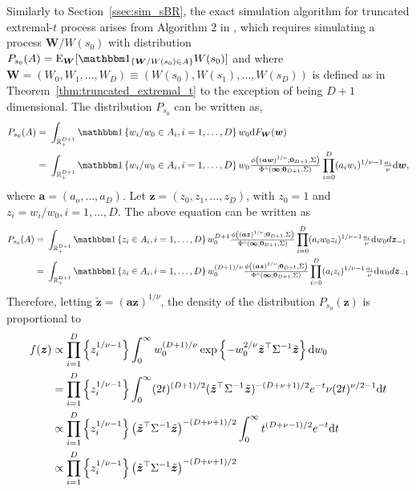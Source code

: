 \documentclass[12pt]{article}
\begin{document}
Similarly to Section~\ref{ssec:sim_sBR}, the exact simulation algorithm for truncated extremal-$t$ process arises from Algorithm 2 in \cite{Dombry.Engelke.Oesting:2016}, which requires simulating a process $\bm W/W(s_0)$ with distribution $P_{s_0}(A) = \E_{\bm W}[\mathbbm 1_{\{\bm W/W(s_0)\in A\}}W(s_0)]$ and where $\bm W = (W_0, W_1, \ldots, W_D) \equiv \left( W(s_0), W(s_1), \ldots, W(s_D)\right)$ is defined as in Theorem~\ref{thm:truncated_extremal_t} to the exception of being $D+1$ dimensional. The distribution $P_{s_0}$ can be written as,
\begin{align*}
	P_{s_0}(A) =&\ \int_{\mathbb{R}_+^{D+1}} \mathbbm 1 \left\{w_i/w_0 \in A_i, i=1,\dots,D  \right\} w_0 \text dF_{\bm W}(\bm w)  \\
	=&\ \int_{\mathbb{R}_+^{D+1}} \mathbbm 1 \left\{ w_i/w_0 \in A_i, i=1,\dots,D \right\} w_0 \frac{\phi\left(\left( \bm a \bm w\right)^{1/\nu};\bm 0_{D+1},\Sigma\right)}{\Phi^\circ(\bm \infty; \bm 0_{D+1}, \Sigma)} \prod_{i=0}^D(a_i w_i)^{1/\nu-1} \frac{a_i}{\nu} \text d \bm w,
\end{align*}  	
where $\bm a = (a_o, \ldots, a_D)$.
Let $\bm z = (z_0, z_1, \ldots, z_D)$, with $z_0 = 1$ and $z_i = w_i/w_0, i=1, \ldots, D$. The above equation can be written as
%
\begin{align*}
P_{s_0}(A) =&\ \int_{\mathbb{R}_+^{D+1}} \mathbbm 1 \left\{z_i \in A_i, i=1,\dots,D\right\} w_0^{D+1} 
\frac{\phi\left(\left( \bm a \bm z\right)^{1/\nu};\bm 0_{D+1},\Sigma\right)}{\Phi^\circ(\bm \infty; \bm 0_{D+1}, \Sigma)} \prod_{i=0}^D(a_i w_0 z_i)^{1/\nu-1} \frac{a_i}{\nu} \text dw_0 d \bm z_{-1}\\
=&\ \int_{\mathbb{R}_+^{D+1}} \mathbbm 1 \left\{ z_i \in A_i, i=1,\dots,D\right\} w_0^{(D+1)/\nu} \frac{\phi\left(\left( \bm a \bm z\right)^{1/\nu};\bm 0_{D+1},\Sigma\right)}{\Phi^\circ(\bm \infty; \bm 0_{D+1}, \Sigma)} \prod_{i=0}^D(a_i z_i)^{1/\nu-1} \frac{a_i}{\nu} \text dw_0 d \bm z_{-1}\\
\end{align*}
%
Therefore, letting $\tilde{\bm z} = ( \bm a \bm z)^{1/\nu}$, the density of the distribution $P_{s_0}(\bm z)$ is proportional to 
\begin{align*}
f(\bm z) & \propto \prod_{i=1}^D \left\{ z_i^{1/\nu-1}\right\}
 \int_{0}^{\infty} w_0^{(D+1)/\nu} \exp\left\{- w_0^{2/\nu} \tilde{\bm z}^\top \Sigma^{-1} \tilde{\bm z} \right\} \text dw_0 \\
	&= \prod_{i=1}^D \left\{ z_i^{1/\nu-1} \right\}
 \int_{0}^{\infty} (2t)^{(D+1)/2} (\tilde{\bm z}^\top \Sigma^{-1} \tilde{\bm z})^{-(D+\nu+1)/2} e^{-t} \nu (2t)^{\nu/2-1} \text dt \\
	& \propto  \prod_{i=1}^D \left\{ z_i^{1/\nu-1}\right\}  \left(\tilde{\bm z}^\top \Sigma^{-1} \tilde{\bm z}\right)^{-(D+\nu+1)/2} \int_{0}^{\infty} t^{(D+\nu-1)/2} e^{-t} \text dt \\
	&\propto \prod_{i=1}^D \left\{z_i^{1/\nu-1}\right\} \left(\tilde{\bm z}^\top \Sigma^{-1}\tilde{\bm z}\right)^{-(D+\nu+1)/2}
\end{align*}
\end{document}
